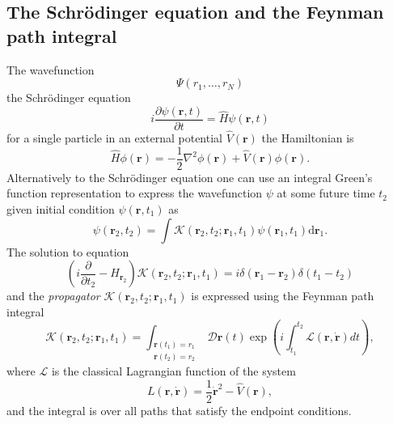 \subsection{The Schr{\"o}dinger equation and the Feynman path integral}
\label{subsec:latt-qm}
The wavefunction
\begin{equation}
	\Psi\left(r_{1}, \ldots, r_{N}\right)
\end{equation}
the Schr\" odinger equation
\begin{equation}
	i \frac{\partial \psi(\boldsymbol{r}, t)}{\partial t}= \hat{H} \psi(\textbf{r}, t)
\end{equation}
for a single particle in an external potential $\hat{V}(\boldsymbol{r})$ the Hamiltonian is 
\begin{equation}
	\hat H \phi(\boldsymbol{r})=-\frac{1}{2} \nabla^{2} \phi(\boldsymbol{r})+\hat{V}(\boldsymbol{r}) \phi(\boldsymbol{r}).
\end{equation}
Alternatively to the Schr\" odinger equation one can use an integral Green's function representation to express the wavefunction $\psi$ at some future time $t_2$ given initial condition $\psi(\boldsymbol{r}, t_1)$ as
\begin{equation}
	\psi\left(\boldsymbol{r}_{2}, t_{2}\right)=\int  \mathcal{K}\left(\boldsymbol{r}_{2}, t_{2} ; \boldsymbol{r}_{1}, t_{1}\right) \psi\left(\boldsymbol{r}_{1}, t_{1}\right) \mathrm{d} \boldsymbol{r}_{1}.
\end{equation}
The solution to  equation
\begin{equation}
	\left(i \frac{\partial}{\partial t_{2}}-H_{\boldsymbol{r}_{2}}\right) \mathcal{K}\left(\boldsymbol{r}_{2}, t_{2} ; \boldsymbol{r}_{1}, t_{1}\right)=i \delta\left(\boldsymbol{r}_{1}-\boldsymbol{r}_{2}\right) \delta\left(t_{1}-t_{2}\right)
\end{equation}
and the \textit{propagator} $\mathcal{K}\left(\boldsymbol{r}_{2}, t_{2} ; \boldsymbol{r}_{1}, t_{1}\right)$ is expressed using the Feynman path integral
\begin{equation}
	\label{eq:FPI}
	\mathcal{K}\left(\boldsymbol{r}_{2}, t_{2} ; \boldsymbol{r}_{1}, t_{1}\right)=\int_{\substack{\boldsymbol{r}\left(t_{1}\right)=r_{1} \\ \boldsymbol{r}\left(t_{2}\right)=r_{2}}}  \mathcal{D} \boldsymbol{r}(t) \exp \left(i \int_{t_{1}}^{t_{2}} \mathcal{L}(\boldsymbol{r}, \dot{\boldsymbol{r}}) d t\right),
\end{equation}
where $\mathcal{L}$ is the classical Lagrangian function of the system
\begin{equation}
	L(\boldsymbol{r}, \dot{\boldsymbol{r}})=\frac{1}{2} \dot{\boldsymbol{r}}^{2}-\hat V(\boldsymbol{r}),
\end{equation}
and the integral is over all paths that satisfy the endpoint conditions.

